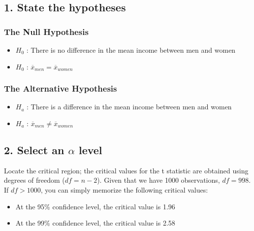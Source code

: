 \documentclass[
  letterpaper,
  DIV=11,
  numbers=noendperiod]{scrreprt}
\providecommand{\tightlist}{%
  \setlength{\itemsep}{0pt}\setlength{\parskip}{0pt}}\usepackage{longtable,booktabs,array}
\begin{document}
\hypertarget{state-the-hypotheses}{%
\subsection{1. State the hypotheses}\label{state-the-hypotheses}}

\hypertarget{the-null-hypothesis}{%
\subsubsection{The Null Hypothesis}\label{the-null-hypothesis}}

\begin{itemize}
\tightlist
\item
  \(H_0\) : There is no difference in the mean income between men and
  women
\item
  \(H_0\) : \(\overline{x}_{men} = \overline{x}_{women}\)
\end{itemize}

\hypertarget{the-alternative-hypothesis}{%
\subsubsection{The Alternative
Hypothesis}\label{the-alternative-hypothesis}}

\begin{itemize}
\tightlist
\item
  \(H_a\) : There is a difference in the mean income between men and
  women
\item
  \(H_a\) : \(\overline{x}_{men} \neq \overline{x}_{women}\)
\end{itemize}

\hypertarget{select-an-alpha-level}{%
\subsection{\texorpdfstring{2. Select an \(\alpha\)
level}{2. Select an \textbackslash alpha level}}\label{select-an-alpha-level}}

Locate the critical region; the critical values for the t statistic are
obtained using degrees of freedom (\(df=n-2\)). Given that we have 1000
observations, \(df=998\). If \(df>1000\), you can simply memorize the
following critical values:

\begin{itemize}
\tightlist
\item
  At the 95\% confidence level, the critical value is 1.96
\item
  At the 99\% confidence level, the critical value is 2.58
\end{itemize}
\end{document}
